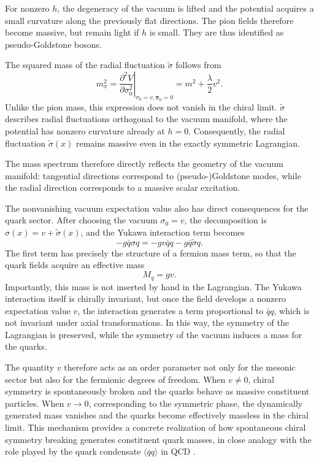 For nonzero $h$, the degeneracy of the vacuum is lifted and the
potential acquires a small curvature along the previously flat
directions. The pion fields therefore become massive, but remain light
if $h$ is small. They are thus identified as pseudo-Goldstone bosons.

The squared mass of the radial fluctuation $\tilde{\sigma}$ follows from
\begin{equation}
m_\sigma^2
=
\left.
\frac{\partial^2 V}{\partial \sigma_0^2}
\right|_{\sigma_0=v,\boldsymbol{\pi}_0=0}
=
m^2 + \frac{\lambda}{2}v^2 .
\end{equation}
Unlike the pion mass, this expression does not vanish in the chiral
limit. $\tilde{\sigma}$ describes radial fluctuations orthogonal to
the vacuum manifold, where the potential has nonzero curvature already
at $h=0$. Consequently, the radial fluctuation $\tilde{\sigma}(x)$ 
remains massive even in the exactly symmetric Lagrangian.

The mass spectrum therefore directly reflects the geometry of the
vacuum manifold: tangential directions correspond to (pseudo-)Goldstone
modes, while the radial direction corresponds to a massive scalar
excitation.

The nonvanishing vacuum expectation value also has direct consequences
for the quark sector. 
After choosing the vacuum $\sigma_0=v$, the decomposition is
$\sigma(x)=v+\tilde{\sigma}(x)$, and the Yukawa interaction term becomes
\begin{equation}
- g \bar q \sigma q
=
- g v \bar q q
- g \bar q \tilde{\sigma} q .
\end{equation}
The first term has precisely the structure of a fermion mass term, so
that the quark fields acquire an effective mass
\begin{equation}
M_q = g v .
\end{equation}
Importantly, this mass is not inserted by hand in the Lagrangian. The
Yukawa interaction itself is chirally invariant, but once the field
develops a nonzero expectation value $v$, the interaction generates a
term proportional to $\bar q q$, which is not invariant under axial
transformations. In this way, the symmetry of the Lagrangian is
preserved, while the symmetry of the vacuum induces a mass for the
quarks.

The quantity $v$ therefore acts as an order parameter not only for the
mesonic sector but also for the fermionic degrees of freedom. When
$v \neq 0$, chiral symmetry is spontaneously broken and the quarks
behave as massive constituent particles. When $v \to 0$, corresponding
to the symmetric phase, the dynamically generated mass vanishes and
the quarks become effectively massless in the chiral limit. This
mechanism provides a concrete realization of how spontaneous chiral
symmetry breaking generates constituent quark masses, in close analogy
with the role played by the quark condensate $\langle \bar q q \rangle$
in QCD \cite{Nambu1961,WeinbergQFT}.

